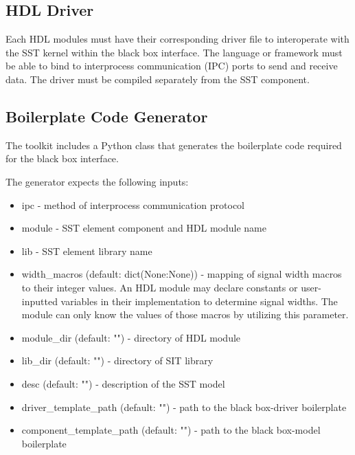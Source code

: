 \documentclass{article}
\begin{document}
    \subsection{HDL Driver}
    Each HDL modules must have their corresponding driver file to interoperate with the SST kernel
    within the black box interface. The language or framework must be able to bind to interprocess
    communication (IPC) ports to send and receive data. The driver must be compiled separately from
    the SST component.

    \subsection{Boilerplate Code Generator}
    The toolkit includes a Python class that generates the boilerplate code required for the black
    box interface.

    The generator expects the following inputs:
    \begin{itemize}

      \item ipc - method of interprocess communication protocol

      \item module - SST element component and HDL module name

      \item lib - SST element library name

      \item width\_macros (default: dict(None:None)) - mapping of signal width macros to their integer values. An HDL module may declare constants or user-inputted variables in their implementation to determine signal widths. The module can only know the values of those macros by utilizing this parameter.

      \item module\_dir (default: "") - directory of HDL module

      \item lib\_dir (default: "") - directory of SIT library

      \item desc (default: "") - description of the SST model

      \item driver\_template\_path (default: "") - path to the black box-driver boilerplate

      \item component\_template\_path (default: "") - path to the black box-model boilerplate

    \end{itemize}
\end{document}
